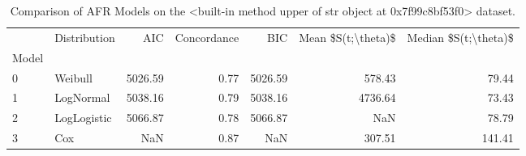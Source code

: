 \begin{table}
\centering
\caption{Comparison of AFR Models on the <built-in method upper of str object at 0x7f99c8bf53f0> dataset.}
\label{tab:mnist}
\begin{tabular}{llrrrrr}
\toprule
{} & Distribution &     AIC &  Concordance &     BIC &  Mean \$S(t;\textbackslash theta)\$ &  Median \$S(t;\textbackslash theta)\$ \\
Model &              &         &              &         &                     &                       \\
\midrule
0     &      Weibull & 5026.59 &         0.77 & 5026.59 &              578.43 &                 79.44 \\
1     &    LogNormal & 5038.16 &         0.79 & 5038.16 &             4736.64 &                 73.43 \\
2     &  LogLogistic & 5066.87 &         0.78 & 5066.87 &                 NaN &                 78.79 \\
3     &          Cox &     NaN &         0.87 &     NaN &              307.51 &                141.41 \\
\bottomrule
\end{tabular}
\end{table}
